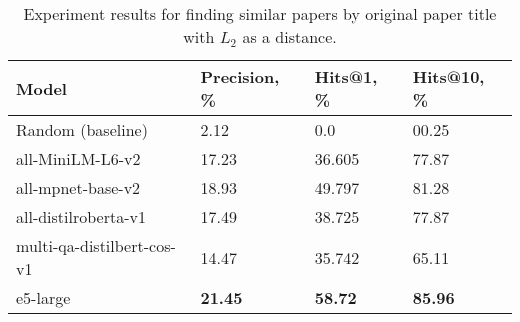 \begin{table*}
    \small
    \centering
    \caption{Experiment results for finding similar papers by original paper title with \(L_{2}\) as a distance.}
    \bigskip
    \begin{tabularx}{0.99\textwidth}{XIII}

        \toprule

        \bfseries Model & \bfseries Precision, \% & \bfseries Hits@1, \% & \bfseries Hits@10, \% \\

        \midrule
        
        Random (baseline)		                & 2.12  &  0.0  	   &    00.25 \\
        
        \midrule

        all-MiniLM-L6-v2	        & 17.23 & 36.605	   &	77.87 \\
        all-mpnet-base-v2	        & 18.93 & 49.797	   &	81.28 \\
        all-distilroberta-v1	    & 17.49 & 38.725	   &	77.87 \\
        multi-qa-distilbert-cos-v1	& 14.47 & 35.742	   &	65.11 \\
        e5-large	                & \bfseries 21.45 & \bfseries 58.72 &	\bfseries 85.96 \\

        \bottomrule

    \end{tabularx}

    \label{tab:experiments:title-l2}
\end{table*}

